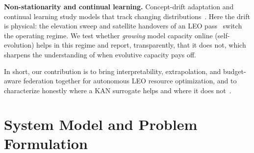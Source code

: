 \documentclass[journal]{IEEEtran}
\begin{document}
\textbf{Non-stationarity and continual learning.} Concept-drift adaptation and
continual learning study models that track changing
distributions~\cite{gama2014drift,delange2022continual}. Here the drift is physical:
the elevation sweep and satellite handovers of an LEO
pass~\cite{kodheli2021ntn,eom2020leo} switch the operating regime. We test whether
\emph{growing} model capacity online (self-evolution) helps in this regime and
report, transparently, that it does not, which sharpens the understanding of when
evolutive capacity pays off.

In short, our contribution is to bring interpretability, extrapolation, and
budget-aware federation together for autonomous LEO resource optimization, and to
characterize honestly where a KAN surrogate helps and where it does
not~\cite{wang2019leoml}.

\section{System Model and Problem Formulation}\label{sec:model}
\end{document}
